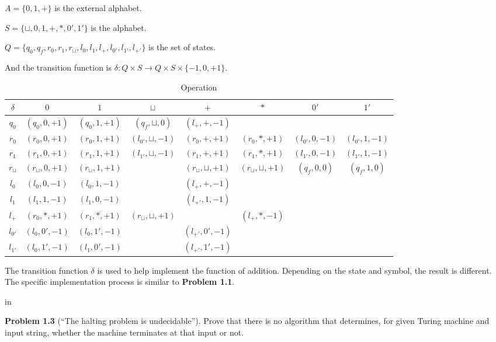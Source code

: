 \documentclass[11pt]{article}
\begin{document}
$A=\{0,1,+\}$ is the external alphabet.

$S=\{\sqcup ,0,1,+,\ast,0',1'\}$ is the alphabet.

$Q=\{q_0,q_f,r_0,r_1,r_{\sqcup},l_0,l_1,l_+,l_{0'},l_{1'},l_{+'}\}$ is the set of states.

And the transition function is $\delta: Q\times S \to Q \times S \times \{-1, 0, +1\}$.

\begin{table}[h]
	\centering
	\caption{Operation}
	\begin{tabular}{|c|ccccccc|}
		\hline
		$\delta$ & $0$ & $1$ & $\sqcup$ & $+$ & $\ast$ & $0'$ & $1'$ \\
		\hline
		$q_0$ & $(q_0,0,+1)$ & $(q_0,1,+1)$&$(q_f,\sqcup,0)$ & $(l_+,+,-1)$ & & &\\
		$r_0$ & $(r_0,0,+1)$ & $(r_0,1,+1)$ & $(l_{0'},\sqcup,-1)$ &$(r_0,+,+1)$ &$(r_0,\ast,+1)$&$(l_{0'},0,-1)$&$(l_{0'},1,-1)$\\
		$r_1$ & $(r_1,0,+1)$ & $(r_1,1,+1)$ & $(l_{1'},\sqcup,-1)$ &$(r_1,+,+1)$ &$(r_1,\ast,+1)$&$(l_{1'},0,-1)$&$(l_{1'},1,-1)$\\
		$r_{\sqcup}$ & $(r_{\sqcup},0,+1)$ &$(r_{\sqcup},1,+1)$ & & $(r_{\sqcup},\sqcup,+1)$ &$(r_{\sqcup},\sqcup,+1)$ &$(q_{f},0,0)$ &$(q_{f},1,0)$\\
		$l_0$ & $(l_0,0,-1)$ & $(l_0,1,-1)$ & & $(l_+,+,-1)$ & & & \\
		$l_1$ & $(l_1,1,-1)$ & $(l_1,0,-1)$ & & $(l_{+'},1,-1)$ & & & \\
		$l_+$ & $(r_0,\ast,+1)$ & $(r_1,\ast,+1)$ & $(r_{\sqcup},\sqcup,+1)$ & &$(l_+,\ast,-1)$ & &\\
		$l_{0'}$ & $(l_0,0',-1)$ & $(l_0,1',-1)$ & & $(l_{+'},0',-1)$ & & & \\
		$l_{1'}$ & $(l_0,1',-1)$ & $(l_1,0',-1)$ & & $(l_{+'},1',-1)$ & & & \\
		\hline
	\end{tabular}
\end{table}

The transition function $\delta$ is used to help implement the function of addition. Depending on the state and symbol, the result is different. The specific implementation process is similar to {\bf Problem 1.1}.

 in

\newpage
{\bf Problem 1.3} (``The halting problem is undecidable''). Prove that there is no algorithm that
determines, for given Turing machine and input string, whether the machine terminates at that input or not.
\end{document}
